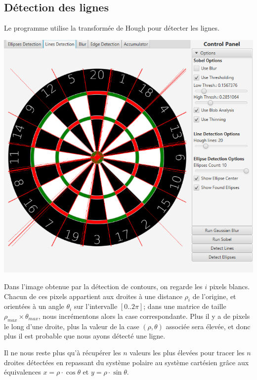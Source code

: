 \documentclass[a4paper, 11pt]{article}
\begin{document}
\begin{multicols}{2}
\section{Détection des lignes}
Le programme utilise la transformée de Hough pour détecter les lignes.
\begin{center}
\includegraphics[width=0.9\linewidth]{img/front_lines_00.png}
\vspace{-2mm}
\label{subfig:frontLines00}
\end{center}

\par
Dans l'image obtenue par la détection de contours, on regarde les $i$ pixels blancs. Chacun de ces pixels appartient aux droites à une distance $\rho_{i}$ de l'origine, et orientées à un angle $\theta_{i}$ sur l'intervalle $[0..2\pi]$; dans une matrice de taille $\rho_{max}\times\theta_{max}$, nous incrémentons alors la case correspondante. Plus il y a de pixels le long d'une droite, plus la valeur de la case $(\rho,\theta)$ associée sera élevée, et donc plus il est probable que nous ayons détecté une ligne.
\par
Il ne nous reste plus qu'à récupérer les $n$ valeurs les plus élevées pour tracer les $n$ droites détectées en repassant du système polaire au système cartésien grâce aux équivalences $x = \rho \cdot \cos\theta$ et $y = \rho \cdot \sin\theta$.


\end{multicols}
\end{document}
